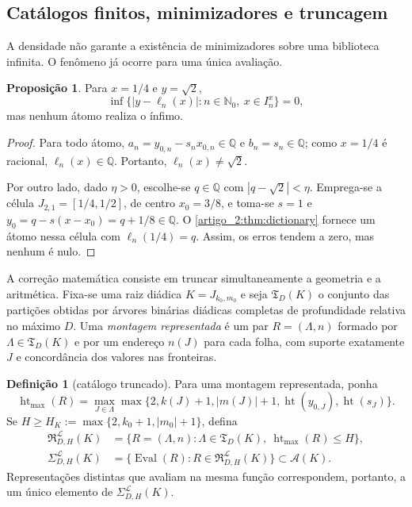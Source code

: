 \documentclass[12pt,a4paper]{article}
\theoremstyle{preciso}
\theoremstyle{definition}
\newcommand{\Nzero}{\mathbb{N}_0}
\newcommand{\Aclass}{\mathcal{A}}
\newcommand{\Library}{\mathcal{L}}
\newcommand{\height}{\operatorname{ht}}
\theoremstyle{preciso}
\theoremstyle{preciso}
\theoremstyle{preciso}
\newtheorem{proposition}[teorema]{Proposição}
\theoremstyle{preciso}
\theoremstyle{definition}
\newtheorem{definition}[teorema]{Definição}
\theoremstyle{preciso}
\theoremstyle{definition}
\theoremstyle{preciso}
\theoremstyle{preciso}
\theoremstyle{definition}
\begin{document}
\subsection{Catálogos finitos, minimizadores e truncagem}

A densidade não garante a existência de minimizadores sobre uma biblioteca
infinita. O fenômeno já ocorre para uma única avaliação.

\begin{proposition}\label{map:artigo_2:3.21}\label{artigo_2:prop:no-minimizer}
Para $x=1/4$ e $y=\sqrt2$,
\[
 \inf\{|y-\ell_n(x)|:n\in\Nzero,\ x\in I_n^x\}=0,
\]
mas nenhum átomo realiza o ínfimo.
\end{proposition}

\begin{proof}
Para todo átomo, $a_n=y_{0,n}-s_nx_{0,n}\in\mathbb{Q}$ e
$b_n=s_n\in\mathbb{Q}$; como $x=1/4$ é racional,
$\ell_n(x)\in\mathbb{Q}$. Portanto, $\ell_n(x)\neq\sqrt2$.

Por outro lado, dado $\eta>0$, escolhe-se $q\in\mathbb{Q}$ com
$|q-\sqrt2|<\eta$. Emprega-se a célula $J_{2,1}=[1/4,1/2]$, de centro $x_0=3/8$,
e toma-se $s=1$ e $y_0=q-s(x-x_0)=q+1/8\in\mathbb{Q}$. O
\cref{artigo_2:thm:dictionary} fornece um átomo nessa célula com
$\ell_n(1/4)=q$. Assim, os erros tendem a zero, mas nenhum é nulo.
\end{proof}

A correção matemática consiste em truncar simultaneamente a geometria e a aritmética. Fixa-se
uma raiz diádica $K=J_{k_0,m_0}$ e seja $\mathfrak T_D(K)$ o conjunto das
partições obtidas por árvores binárias diádicas completas de profundidade
relativa no máximo $D$. Uma \emph{montagem representada} é um par
$R=(\Lambda,n)$ formado por $\Lambda\in\mathfrak T_D(K)$ e por um endereço
$n(J)$ para cada folha, com suporte exatamente $J$ e concordância dos valores
nas fronteiras.

\begin{definition}[catálogo truncado]\label{map:artigo_2:3.22}\label{artigo_2:def:finite-catalog}
Para uma montagem representada, ponha
\[
 \height_{\max}(R)=\max_{J\in\Lambda}
 \max\{2,k(J)+1,|m(J)|+1,\height(y_{0,J}),\height(s_J)\}.
\]
Se
$H\ge H_K:=\max\{2,k_0+1,|m_0|+1\}$, defina
\begin{align}
 \mathfrak R_{D,H}^{\Library}(K)
   &=\{R=(\Lambda,n):\Lambda\in\mathfrak T_D(K),\
       \height_{\max}(R)\le H\},\label{artigo_2:eq:represented-catalog}\\
 \Sigma_{D,H}^{\Library}(K)
   &=\{\operatorname{Eval}(R):R\in
       \mathfrak R_{D,H}^{\Library}(K)\}\subset\Aclass(K).
 \label{artigo_2:eq:finite-catalog}
\end{align}
Representações distintas que avaliam na mesma função correspondem, portanto,
a um único elemento de $\Sigma_{D,H}^{\Library}(K)$.
\end{definition}
\end{document}
